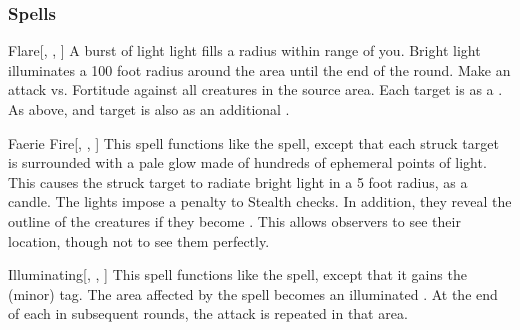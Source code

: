 \subsubsection{Spells}


\lowercase{\hypertarget{spell:Flare}{}}\label{spell:Flare}
\begin{apability}[\nth{1}]{\hypertarget{spell:Flare}{Flare}}[, , ]
A burst of light light fills a \areasmall radius within \rngmed range of you.
Bright light illuminates a 100 foot radius around the area until the end of the round.
Make an attack vs. Fortitude against all creatures in the source area.
\hit Each target is \dazzled as a .
\crit As above, and target is also \dazed as an additional .
\end{apability}
\vspace{0.25em}



\lowercase{\hypertarget{spell:Faerie Fire}{}}\label{spell:Faerie Fire}
\begin{apability}[\nth{2}]{\hypertarget{spell:Faerie Fire}{Faerie Fire}}[, , ]
This spell functions like the  spell, except that each struck target is surrounded with a pale glow made of hundreds of ephemeral points of light.
This causes the struck target to radiate bright light in a 5 foot radius, as a candle.
The lights impose a  penalty to Stealth checks.
In addition, they reveal the outline of the creatures if they become .
This allows observers to see their location, though not to see them perfectly.
\end{apability}
\vspace{0.25em}



\lowercase{\hypertarget{spell:Illuminating}{}}\label{spell:Illuminating}
\begin{apability}[\nth{2}]{\hypertarget{spell:Illuminating}{Illuminating}}[, , ]
This spell functions like the  spell, except that it gains the  (minor) tag.
The area affected by the spell becomes an illuminated .
At the end of each  in subsequent rounds, the attack is repeated in that area.
\end{apability}
\vspace{0.25em}



